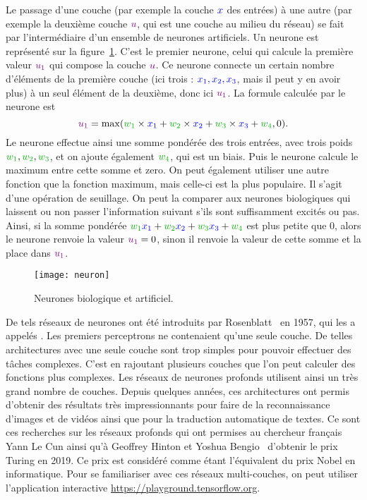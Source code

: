 Le passage d'une couche (par exemple la couche ${\color{blue} x}$ des entrées) à une autre (par exemple la deuxième couche ${\color[rgb]{.5,0,.5} u}$, qui est une couche  au milieu du réseau) se fait par l'intermédiaire d'un ensemble de neurones artificiels. Un neurone est représenté sur la figure~\ref{fig:neuron}. C'est le premier neurone, celui qui calcule la première valeur ${\color[rgb]{.5,0,.5} u_1}$ qui compose la couche ${\color[rgb]{.5,0,.5} u}$. Ce neurone connecte un certain nombre d'éléments de la première couche (ici trois : ${\color{blue} x_1, x_2, x_3}$, mais il peut y en avoir plus) à un seul élément de la deuxième, donc ici ${\color[rgb]{.5,0,.5} u_1}$. La formule calculée par le neurone est 
$$
	{\color[rgb]{.5,0,.5} u_1} = \max( \mygreen{w_1} \times \myblue{x_1} + \mygreen{w_2} \times \myblue{x_2} + \mygreen{w_3} \times \myblue{x_3} + \mygreen{w_4}, 0 ).
$$ 
Le neurone effectue ainsi une somme pondérée des trois entrées, avec trois poids $\mygreen{w_1},\mygreen{w_2},\mygreen{w_3}$, et on ajoute également $\mygreen{w_4}$, qui est un biais. Puis le neurone calcule le maximum entre cette somme et zero. On peut également utiliser une autre fonction que la fonction maximum, mais celle-ci est la plus populaire. Il s'agit d'une opération de seuillage. On peut la comparer aux neurones biologiques qui laissent ou non passer l'information suivant s'ils sont suffisamment excités ou pas.   
%
Ainsi, si la somme pondérée 
$\mygreen{w_1} {\color{blue} x_1} + \mygreen{w_2} {\color{blue} x_2} + \mygreen{w_3} {\color{blue} x_3} + \mygreen{w_4}$ 
est plus petite que 0, alors le neurone renvoie la valeur ${\color[rgb]{.5,0,.5} u_1}=0$, sinon il renvoie la valeur de cette somme et la place dans ${\color[rgb]{.5,0,.5} u_1}$.


\begin{figure}\centering
	\texttt{[image: neuron]}
\caption{\label{fig:neuron} Neurones biologique et artificiel. }
\end{figure}

De tels réseaux de neurones ont été introduits par Rosenblatt~\cite{rosenblatt1957perceptron} en 1957, qui les a appelés . 
Les premiers perceptrons ne contenaient qu'une seule couche. 
%
De telles architectures avec une seule couche sont trop simples pour pouvoir effectuer des tâches complexes. C'est en rajoutant plusieurs couches que l'on peut calculer des fonctions plus complexes. 
%
Les réseaux de neurones profonds utilisent ainsi un très grand nombre de couches. Depuis quelques années, ces architectures ont permis d'obtenir des résultats très impressionnants pour faire de la reconnaissance d'images et de vidéos ainsi que pour la traduction automatique de textes. Ce sont ces recherches sur les réseaux profonds qui ont permises au chercheur français Yann Le Cun ainsi qu'à Geoffrey Hinton et Yoshua Bengio~\cite{lecun2015deep} d'obtenir le prix Turing en 2019. Ce prix est considéré comme étant l'équivalent du prix Nobel en informatique.  
%
Pour se familiariser avec ces réseaux multi-couches, on peut utiliser l'application interactive \url{https://playground.tensorflow.org}.

